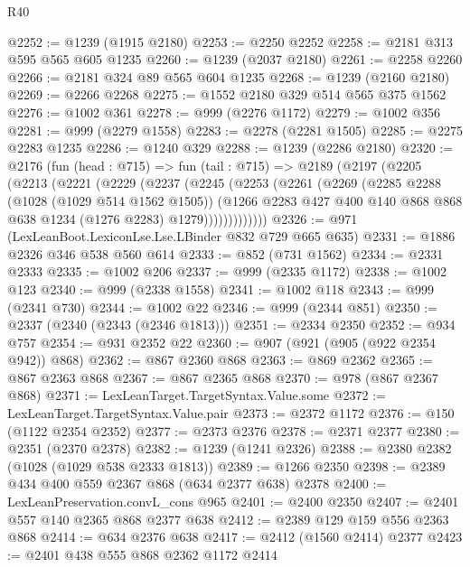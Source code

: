 \begin{lexlean}{R40}
\begin{coremodule}
@2252 := @1239 (@1915 @2180)
@2253 := @2250 @2252
@2258 := @2181 @313 @595 @565 @605 @1235
@2260 := @1239 (@2037 @2180)
@2261 := @2258 @2260
@2266 := @2181 @324 @89 @565 @604 @1235
@2268 := @1239 (@2160 @2180)
@2269 := @2266 @2268
@2275 := @1552 @2180 @329 @514 @565 @375 @1562
@2276 := @1002 @361
@2278 := @999 (@2276 @1172)
@2279 := @1002 @356
@2281 := @999 (@2279 @1558)
@2283 := @2278 (@2281 @1505)
@2285 := @2275 @2283 @1235
@2286 := @1240 @329
@2288 := @1239 (@2286 @2180)
@2320 := @2176
    (fun (head : @715) =>
    fun (tail : @715) =>
    @2189
      (@2197
        (@2205
          (@2213
            (@2221
              (@2229
                (@2237
                  (@2245
                    (@2253
                      (@2261
                        (@2269
                          (@2285
                            @2288
                            (@1028 (@1029 @514 @1562 @1505))
                            (@1266
                              @2283
                              @427
                              @400
                              @140
                              @868
                              @868
                              @638
                              @1234
                              (@1276 @2283)
                              @1279)))))))))))))
@2326 := @971 (LexLeanBoot.LexiconLse.Lse.LBinder @832 @729 @665 @635)
@2331 := @1886 @2326 @346 @538 @560 @614
@2333 := @852 (@731 @1562)
@2334 := @2331 @2333
@2335 := @1002 @206
@2337 := @999 (@2335 @1172)
@2338 := @1002 @123
@2340 := @999 (@2338 @1558)
@2341 := @1002 @118
@2343 := @999 (@2341 @730)
@2344 := @1002 @22
@2346 := @999 (@2344 @851)
@2350 := @2337 (@2340 (@2343 (@2346 @1813)))
@2351 := @2334 @2350
@2352 := @934 @757
@2354 := @931 @2352 @22
@2360 := @907 (@921 (@905 (@922 @2354 @942)) @868)
@2362 := @867 @2360 @868
@2363 := @869 @2362
@2365 := @867 @2363 @868
@2367 := @867 @2365 @868
@2370 := @978 (@867 @2367 @868)
@2371 := LexLeanTarget.TargetSyntax.Value.some
@2372 := LexLeanTarget.TargetSyntax.Value.pair
@2373 := @2372 @1172
@2376 := @150 (@1122 @2354 @2352)
@2377 := @2373 @2376
@2378 := @2371 @2377
@2380 := @2351 (@2370 @2378)
@2382 := @1239 (@1241 @2326)
@2388 := @2380 @2382 (@1028 (@1029 @538 @2333 @1813))
@2389 := @1266 @2350
@2398 := @2389 @434 @400 @559 @2367 @868 (@634 @2377 @638) @2378
@2400 := LexLeanPreservation.convL_cons @965
@2401 := @2400 @2350
@2407 := @2401 @557 @140 @2365 @868 @2377 @638
@2412 := @2389 @129 @159 @556 @2363 @868
@2414 := @634 @2376 @638
@2417 := @2412 (@1560 @2414) @2377
@2423 := @2401 @438 @555 @868 @2362 @1172 @2414

\end{coremodule}
\end{lexlean}
